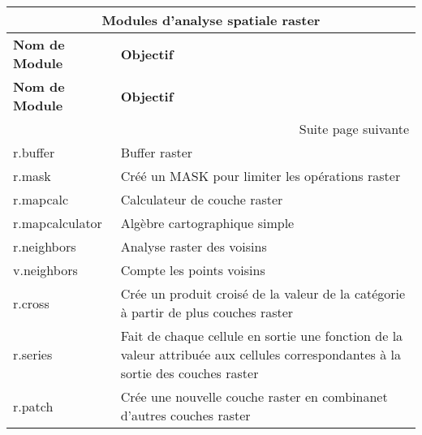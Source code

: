 \begin{center}
{\setlength{\extrarowheight}{10pt}
\small
\begin{longtable}{|p{2.5cm}|p{11.5cm}|}
\hline \multicolumn{2}{|c|}{\textbf{Modules d'analyse spatiale raster}} \\
\hline \textbf{Nom de Module}&\textbf{Objectif}\\
\endfirsthead
\textbf{Nom de Module}&\textbf{Objectif}\\
\endhead
\hline \multicolumn{2}{|r|}{{Suite page suivante}} \\ \hline
\endfoot
\endlastfoot
  \hline r.buffer & Buffer raster\\
  \hline r.mask & Créé un MASK pour limiter les opérations raster\\
  \hline r.mapcalc & Calculateur de couche raster \\
  \hline r.mapcalculator & Algèbre cartographique simple \\
  \hline r.neighbors & Analyse raster des voisins\\
  \hline v.neighbors & Compte les points voisins \\
  \hline r.cross & Crée un produit croisé de la valeur de la catégorie à partir de plus couches raster \\
  \hline r.series & Fait de chaque cellule en sortie une fonction de la valeur attribuée aux cellules correspondantes à la sortie des couches raster\\
  \hline r.patch & Crée une nouvelle couche raster en combinanet d'autres couches raster \\

\end{longtable}}
\end{center}

